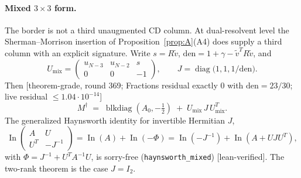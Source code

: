 \documentclass[11pt]{article}
\theoremstyle{remark}
\newcommand{\half}{\tfrac12}
\newcommand{\gr}[1]{\textnormal{\small[#1]}}
\begin{document}
\paragraph{Mixed $3\times3$ form.}
The border is not a third unaugmented CD column.  At dual-resolvent
level the Sherman--Morrison insertion of Proposition~\ref{prop:A}(A4)
does supply a third column with an explicit signature.  Write
$s=R\widetilde v$, $\mathrm{den}=1+\gamma-\widetilde v^{T}R\widetilde v$,
and
\[
U_{\mathrm{mix}}
=
\begin{pmatrix}
u_{N-3}&u_{N-2}&s\\
0&0&-1
\end{pmatrix},\qquad
J=\operatorname{diag}\bigl(1,1,1/\mathrm{den}\bigr).
\]
Then \gr{theorem-grade, round 369; Fractions residual exactly $0$
with $\mathrm{den}=23/30$; live residual $\le1.04\cdot10^{-14}$}
\begin{equation}\label{eq:mixed}
M^{\dagger}
\;=\;
\operatorname{blkdiag}(A_{0},-\half)
\;+\;
U_{\mathrm{mix}}\,J\,U_{\mathrm{mix}}^{T}.
\end{equation}
The generalized Haynsworth identity for invertible Hermitian $J$,
\[
\operatorname{In}
\begin{pmatrix}A&U\\U^{T}&-J^{-1}\end{pmatrix}
=
\operatorname{In}(A)+\operatorname{In}(-\Phi)
=
\operatorname{In}(-J^{-1})+\operatorname{In}(A+UJU^{T}),
\]
with $\Phi=J^{-1}+U^{T}A^{-1}U$, is sorry-free
(\texttt{haynsworth\_mixed}) \gr{lean-verified}.  The two-rank
theorem is the case $J=I_{2}$.
\end{document}

